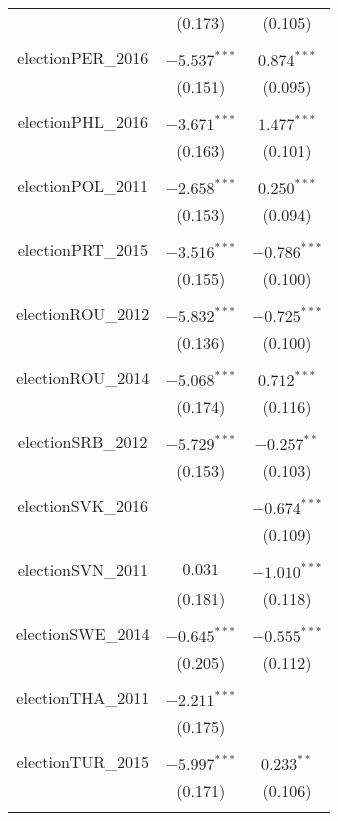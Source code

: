 \documentclass[12pt, titlepage]{article}
\begin{document}
\begin{longtable}[H]{ccc }
		& (0.173) & (0.105) \\ 
		& & \\ 
		electionPER\_2016 & $-5.537^{***}$ & $0.874^{***}$ \\ 
		& (0.151) & (0.095) \\ 
		& & \\ 
		electionPHL\_2016 & $-3.671^{***}$ & $1.477^{***}$ \\ 
		& (0.163) & (0.101) \\ 
		& & \\ 
		electionPOL\_2011 & $-2.658^{***}$ & $0.250^{***}$ \\ 
		& (0.153) & (0.094) \\ 
		& & \\ 
		electionPRT\_2015 & $-3.516^{***}$ & $-0.786^{***}$ \\ 
		& (0.155) & (0.100) \\ 
		& & \\ 
		electionROU\_2012 & $-5.832^{***}$ & $-0.725^{***}$ \\ 
		& (0.136) & (0.100) \\ 
		& & \\ 
		electionROU\_2014 & $-5.068^{***}$ & $0.712^{***}$ \\ 
		& (0.174) & (0.116) \\ 
		& & \\ 
		electionSRB\_2012 & $-5.729^{***}$ & $-0.257^{**}$ \\ 
		& (0.153) & (0.103) \\ 
		& & \\ 
		electionSVK\_2016 &  & $-0.674^{***} $\\ 
		&  & (0.109) \\ 
		& & \\ 
		electionSVN\_2011 & $0.031$ & $-1.010^{***}$ \\ 
		& (0.181) & (0.118) \\ 
		& & \\ 
		electionSWE\_2014 & $-0.645^{***}$ & $-0.555^{***}$ \\ 
		& (0.205) & (0.112) \\ 
		& & \\ 
		electionTHA\_2011 & $-2.211^{***}$ &  \\ 
		& (0.175) &  \\ 
		& & \\ 
		electionTUR\_2015 &$ -5.997^{***}$ & $0.233^{**}$ \\ 
		& (0.171) & (0.106) \\ 
		& & \\ 

\end{longtable}
\end{document}
